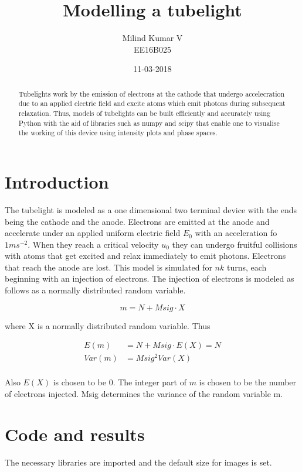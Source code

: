 \documentclass[a4paper, 11pt, margin= 1.25cm]{article}
\title{Modelling a tubelight}
\date{11-03-2018}
\author{Milind Kumar V\\ EE16B025}
\begin{document}
    
    
    \maketitle
    
    

\begin{multicols}{2}
    
    \begin{abstract}\label{abstract}

Tubelights work by the emission of electrons at the cathode that undergo
accelecration due to an applied electric field and excite atoms which
emit photons during subsequent relaxation. Thus, models of tubelights
can be built efficiently and accurately using Python with the aid of
libraries such as numpy and scipy that enable one to visualise the
working of this device using intensity plots and phase spaces.
\end{abstract}
\section{Introduction}\label{introduction}

The tubelight is modeled as a one dimensional two terminal device with
the ends being the cathode and the anode. Electrons are emitted at the
anode and accelerate under an applied uniform electric field $E_0$ with
an acceleration fo $1ms^{-2}$. When they reach a critical velocity $u_0$
they can undergo fruitful collisions with atoms that get excited and
relax immediately to emit photons. Electrons that reach the anode are
lost. This model is simulated for $nk$ turns, each beginning with an
injection of electrons. The injection of electrons is modeled as follows
as a normally distributed random variable.

\begin{equation}
m = N + Msig \cdot X
\end{equation}

where X is a normally distributed random variable. Thus

\begin{align}
E(m) &=N + Msig \cdot E(X) = N\\
Var(m) &= Msig^2Var(X)\\
\end{align}

Also $E(X)$ is chosen to be $0$. The integer part of $m$ is chosen to be
the number of electrons injected. Msig determines the variance of the
random variable m.

\section{Code and results}\label{code-and-results}

The necessary libraries are imported and the default size for images is
set.
   \end{multicols}
\end{document}
